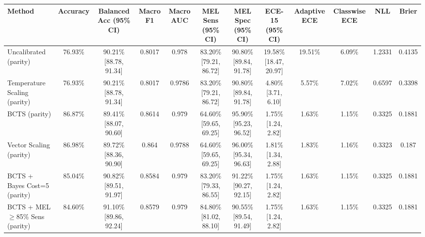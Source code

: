 \begin{tabular}{lccccccccccc}
\toprule
Method & Accuracy & Balanced Acc (95\% CI) & Macro F1 & Macro AUC & MEL Sens (95\% CI) & MEL Spec (95\% CI) & ECE-15 (95\% CI) & Adaptive ECE & Classwise ECE & NLL & Brier \\
\midrule
Uncalibrated (parity) & 76.93\% & 90.21\% [88.78, 91.34] & 0.8017 & 0.978 & 83.20\% [79.21, 86.72] & 90.80\% [89.84, 91.78] & 19.58\% [18.47, 20.97] & 19.51\% & 6.09\% & 1.2331 & 0.4135 \\
Temperature Scaling (parity) & 76.93\% & 90.21\% [88.78, 91.34] & 0.8017 & 0.9786 & 83.20\% [79.21, 86.72] & 90.80\% [89.84, 91.78] & 4.80\% [3.71, 6.10] & 5.57\% & 7.02\% & 0.6597 & 0.3398 \\
BCTS (parity) & 86.87\% & 89.41\% [88.07, 90.60] & 0.8614 & 0.979 & 64.60\% [59.65, 69.25] & 95.90\% [95.23, 96.52] & 1.75\% [1.24, 2.82] & 1.63\% & 1.15\% & 0.3325 & 0.1881 \\
Vector Scaling (parity) & 86.98\% & 89.72\% [88.36, 90.90] & 0.864 & 0.9788 & 64.60\% [59.65, 69.25] & 96.00\% [95.34, 96.63] & 1.81\% [1.34, 2.88] & 1.83\% & 1.16\% & 0.3323 & 0.187 \\
BCTS + Bayes Cost=5 (parity) & 85.04\% & 90.82\% [89.51, 91.97] & 0.8584 & 0.979 & 83.20\% [79.33, 86.55] & 91.22\% [90.27, 92.15] & 1.75\% [1.24, 2.82] & 1.63\% & 1.15\% & 0.3325 & 0.1881 \\
BCTS + MEL$\ge$85\% Sens (parity) & 84.60\% & 91.10\% [89.86, 92.24] & 0.8579 & 0.979 & 84.80\% [81.02, 88.10] & 90.55\% [89.54, 91.49] & 1.75\% [1.24, 2.82] & 1.63\% & 1.15\% & 0.3325 & 0.1881 \\
\bottomrule
\end{tabular}
